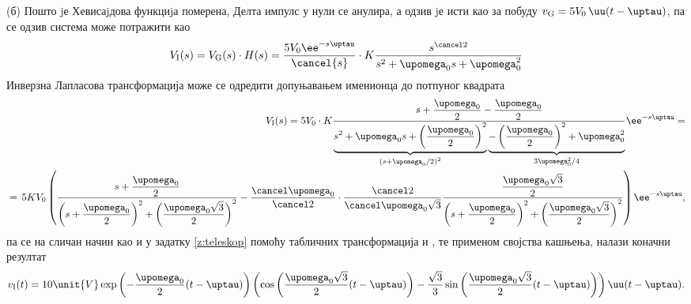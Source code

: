 (б)
Пошто jе Хевисаjдова функциjа померена, Делта импулс у нули се анулира, а одзив jе исти као за побуду
$v_{\rm G} = 5 V_0 \, \uu(t - \uptau)$, па се одзив система може потражити као 
\begin{eqnarray}
    V_{\rm I}(s) = 
    V_{\rm G}(s) \cdot H(s)
    =
    \dfrac{5 V_0 \ee^{-s\uptau}}{\cancel{s}} \cdot 
    K\dfrac{s^{\cancel2}}{s^2 + \upomega_0 s + \upomega_0^2 }
\end{eqnarray}
Инверзна Лапласова трансформација може се одредити допуњавањем именионца до потпуног квадрата
\begin{eqnarray}
    && V_{\rm I}(s)=5 V_0 \cdot 
    K\dfrac{
        s + \dfrac{\upomega_0}{2} - \dfrac{\upomega_0}{2}
    }{
    \underbrace{s^2 + \upomega_0 s + \left(\dfrac{\upomega_0}{2}\right)^2}_{
        \left(
            s + \upomega_0/2
        \right)^2
    } 
    \underbrace{
    - \left(\dfrac{\upomega_0}{2}\right)^2  + \upomega_0^2 }_{ {3\upomega_0^2}/{4} } 
    }
    \ee^{-s\uptau} = \\
    &=& \hspace*{-2mm} 5KV_0 
        \left(
            \dfrac{
            s + \dfrac{\upomega_0}{2} 
            }{
               \left(s + \dfrac{\upomega_0}2 \right)^2 + \left( \dfrac{\upomega_0 \sqrt 3}{2} \right)^2
            }
            - \dfrac{\cancel \upomega_0}{\cancel 2}
            \cdot
            \dfrac{\cancel 2}{\cancel \upomega_0 \sqrt3}
            \dfrac{
                \dfrac{\upomega_0 \sqrt 3}{2}
            }{
                \left(s + \dfrac{\upomega_0}2 \right)^2 + \left( \dfrac{\upomega_0 \sqrt 3}{2} \right)^2
            }
    \right)
    \ee^{-s\uptau},
\end{eqnarray}
па се на сличан начин као и у задатку \ref{z:teleskop} помоћу табличних трансформација 
 и , те применом својства кашњења, налази коначни резултат 
\begin{equation}
    v_{\rm I}(t) = 
    10\unit{V}
    \exp\left(- \dfrac{\upomega_0}{2} (t-\uptau)\right)
    \left( 
        \cos\left( \dfrac{\upomega_0\sqrt3}{2}(t-\uptau) \right)
        -
        \dfrac{\sqrt 3}{3}
        \sin\left( \dfrac{\upomega_0\sqrt3}{2}(t-\uptau) \right)
    \right) \uu(t-\uptau).
\end{equation}